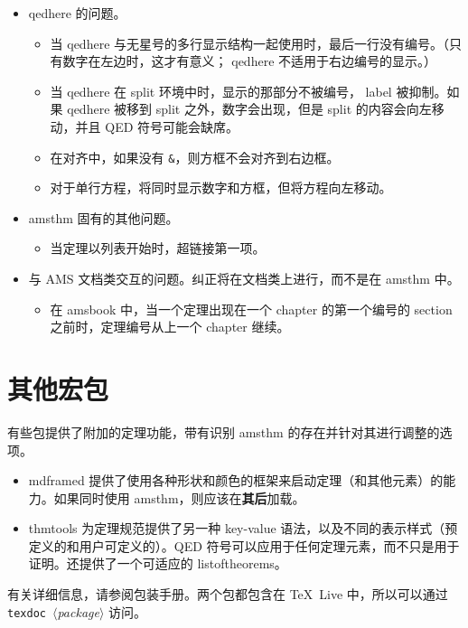 \documentclass[11pt,twoside]{article}
\renewcommand{\emph}[1]{\textbf{#1}}
\newcommand{\ntt}{%
  \fontfamily\ttdefault \fontseries\mddefault \fontshape\updefault
  \selectfont
}
\DeclareRobustCommand{\cn}[1]{{\ntt\bslchar#1}}
\DeclareRobustCommand{\cls}[1]{{\ntt#1}}
\DeclareRobustCommand{\pkg}[1]{{\ntt#1}}
\DeclareRobustCommand{\env}[1]{{\ntt#1}}
\def\<#1>{{\normalfont$\langle$\textit{#1}$\rangle$}}
\begin{document}
\begin{itemize}
\item \cn{qedhere} 的问题。 %
 \begin{itemize}
  \item 当 \cn{qedhere} 与无星号的多行显示结构一起使用时，最后一行没有编号。（只有数字在左边时，这才有意义；\cn{qedhere} 不适用于右边编号的显示。）
  \item 当 \cn{qedhere} 在 \env{split} 环境中时，显示的那部分不被编号，\cn{label} 被抑制。如果 \cn{qedhere} 被移到 \env{split} 之外，数字会出现，但是 \env{split} 的内容会向左移动，并且 QED 符号可能会缺席。
  \item 在对齐中，如果没有 \verb+&+，则方框不会对齐到右边框。
  \item 对于单行方程，将同时显示数字和方框，但将方程向左移动。
 \end{itemize}
\item \pkg{amsthm} 固有的其他问题。
 \begin{itemize}
  \item 当定理以列表开始时，超链接第一项。
 \end{itemize}
\item 与 AMS 文档类交互的问题。纠正将在文档类上进行，而不是在 \pkg{amsthm} 中。
 \begin{itemize}
  \item 在 \cls{amsbook} 中，当一个定理出现在一个 chapter 的第一个编号的 section 之前时，定理编号从上一个 chapter 继续。
 \end{itemize}
\end{itemize}


\section{其他宏包}

有些包提供了附加的定理功能，带有识别 \pkg{amsthm} 的存在并针对其进行调整的选项。
\begin{itemize}
\itemsep=.5\itemsep
\item \pkg{mdframed} \cite{MDF} 提供了使用各种形状和颜色的框架来启动定理（和其他元素）的能力。如果同时使用 \pkg{amsthm}，则应该在\emph{其后}加载。
\item \pkg{thmtools} \cite{THT} 为定理规范提供了另一种 key-value 语法，以及不同的表示样式（预定义的和用户可定义的）。QED 符号可以应用于任何定理元素，而不只是用于证明。还提供了一个可适应的 \cn{listoftheorems}。
\end{itemize}
有关详细信息，请参阅包装手册。两个包都包含在 \TeX~Live 中，所以可以通过 \texttt{texdoc}~\<package> 访问。
\end{document}
